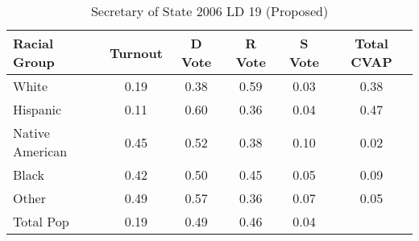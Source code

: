 \begin{table}[htb]
\begin{center}
\caption{Secretary of State 2006 LD 19 (Proposed)}
\label{sos06_cvap_ld_19}
\begin{tabular}{lccccc}
  \hline
Racial Group & Turnout & D Vote & R Vote & S Vote & Total CVAP \\ 
  \hline
White & 0.19 & 0.38 & 0.59 & 0.03 & 0.38 \\ 
  Hispanic & 0.11 & 0.60 & 0.36 & 0.04 & 0.47 \\ 
  Native American & 0.45 & 0.52 & 0.38 & 0.10 & 0.02 \\ 
  Black & 0.42 & 0.50 & 0.45 & 0.05 & 0.09 \\ 
  Other & 0.49 & 0.57 & 0.36 & 0.07 & 0.05 \\ 
  Total Pop & 0.19 & 0.49 & 0.46 & 0.04 &  \\ 
   \hline
\end{tabular}
\end{center}
\end{table}
